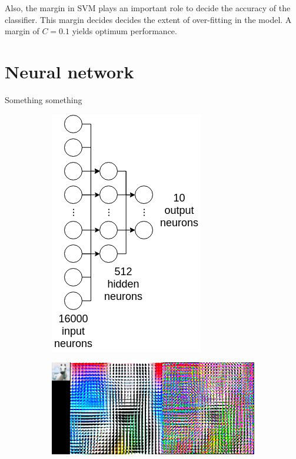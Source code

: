 \documentclass{article} %
\begin{document}
Also, the margin in SVM plays an important role to decide the accuracy of the classifier. This margin decides decides the extent of over-fitting in the model. A margin of $C=0.1$ yields optimum performance.

\section{Neural network}
\label{sub:neural}
    Something something
    \begin{figure}
        \centering
        \begin{subfigure}{.3\linewidth}
            \centering
            \includegraphics[width=.5\linewidth]{images/neural-architecture.png}
            \caption{}
        \end{subfigure}
        \begin{subfigure}{.4\linewidth}
            \centering
            \includegraphics[width=.75\linewidth]{images/normalize-zca.png}
        \caption{}
        \end{subfigure}
        \begin{subfigure}{.1\linewidth}

\end{subfigure}
\end{figure}
\end{document}

